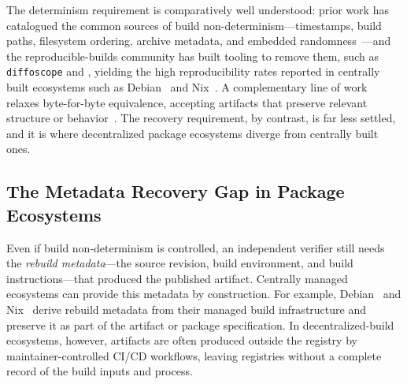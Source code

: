 The determinism requirement is comparatively well understood: prior work has catalogued the common sources of build non-determinism---timestamps, build paths, filesystem ordering, archive metadata, and embedded randomness~\cite{noauthor_variations_nodate, lamb_reproducible_2022, fourne_its_2023, malkaDoesFunctionalPackage2025}---and the reproducible-builds community has built tooling to remove them, such as \texttt{diffoscope} and , yielding the high reproducibility rates reported in centrally built ecosystems such as Debian~\cite{lamb_reproducible_2022, DebianReproducibleTests} and Nix~\cite{malkaDoesFunctionalPackage2025}. A complementary line of work relaxes byte-for-byte equivalence, accepting artifacts that preserve relevant structure or behavior~\cite{dietrich_levels_2025}.
The recovery requirement, by contrast, is far less settled, and it is where decentralized package ecosystems diverge from centrally built ones.


\subsection{The Metadata Recovery Gap in Package Ecosystems}
\label{subsec:bg-verifiability-gap}

Even if build non-determinism is controlled, an independent verifier still needs the \emph{rebuild metadata}---the source revision, build environment, and build instructions---that produced the published artifact.
Centrally managed ecosystems can provide this metadata by construction. 
For example, Debian~\cite{lamb_reproducible_2022} and Nix~\cite{malkaDoesFunctionalPackage2025} derive rebuild metadata from their managed build infrastructure and preserve it as part of the artifact or package specification. 
In decentralized-build ecosystems, however, artifacts are often produced outside the registry by maintainer-controlled CI/CD workflows, leaving registries without a complete record of the build inputs and process.

